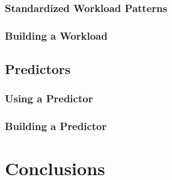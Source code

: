 \documentclass[12pt]{book}
\begin{document}
\subsection{Standardized Workload Patterns}

\subsection{Building a Workload}

\section{Predictors}

\subsection{Using a Predictor}

\subsection{Building a Predictor}

\chapter{Conclusions}
\end{document}
